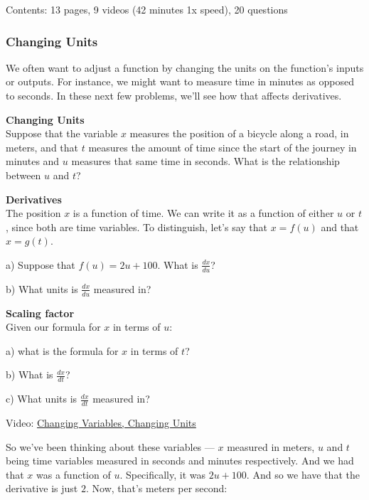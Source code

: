\documentclass[pdftex, brazil, 12pt, twoside]{article}
\begin{document}
Contents: 13 pages, 9 videos (42 minutes 1x speed), 20 questions

\subsubsection{Changing Units}
\label{u2-chain-rule-changing-units}

We often want to adjust a function by changing the units on the function's inputs
or outputs. For instance, we might want to measure time in minutes as opposed to
seconds. In these next few problems, we'll see how that affects derivatives.

\begin{exercise}
  \textbf{Changing Units}\\%
  Suppose that the variable $x$ measures the position of a bicycle along a road,
  in meters, and that $t$ measures the amount of time since the start of the journey
  in minutes and $u$ measures that same time in seconds. What is the relationship
  between $u$ and $t$?
\end{exercise}

\begin{exercise}
  \textbf{Derivatives}\\%
  The position $x$ is a function of time. We can write it as a function of either
  $u$ or $t$, since both are time variables. To distinguish, let's say that
  $x = f(u)$ and that $x = g(t)$.

  a) Suppose that $f(u) = 2u + 100$. What is $\displaystyle \frac{dx}{du}$?

  b) What units is $\displaystyle \frac{dx}{du}$ measured in?
\end{exercise}

\begin{exercise}
  \textbf{Scaling factor}\\%
  Given our formula for $x$ in terms of $u$:

  a) what is the formula for $x$ in terms of $t$?

  b) What is $\displaystyle \frac{dx}{dt}$?

  c) What units is $\displaystyle \frac{dx}{dt}$ measured in?
\end{exercise}

Video: \href{https://www.youtube.com/watch?v=d-tiVU6k-YA}{Changing Variables, Changing Units}

So we've been thinking about these variables ---
$x$ measured in meters, $u$ and $t$ being time variables measured
in seconds and minutes respectively.
And we had that $x$ was a function of $u$.
Specifically, it was $2u + 100$.
And so we have that the derivative is just $2$.
Now, that's meters per second:
\end{document}
